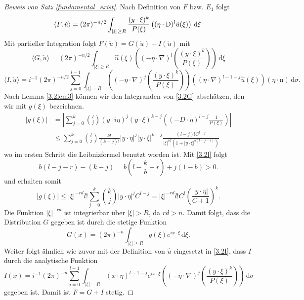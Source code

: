 \begin{proof}[Beweis von Satz \ref{fundamental_exist}]
Nach Definition von $F$ bzw. $E_1$ folgt 
\begin{equation}\label{3.2F}
\langle F, \check u\rangle = (2\pi)^{-n/2} \int_{|\xi|\ge R} \frac{(y\cdot \xi)^k}{P(\xi)} \left ( (\eta\cdot \mathrm D)^l \hat u(\xi)\right )\, \mathrm d\xi.
\end{equation}
Mit partieller Integration folgt $F(\check u)=G(\check u) + I(\check u)$ mit
\begin{equation}\label{3.2G}
\langle G,\check u\rangle = (2\pi)^{-n/2} \int_{|\xi|\ge R} \hat u(\xi) \left ( (-\eta \cdot \nabla)^l \left ( \frac{(y\cdot \xi)^k}{P(\xi)} \right ) \right )\, \mathrm d\xi
\end{equation}
\begin{equation}\label{3.2I}
\langle I,\check u\rangle = i^{-1} (2\pi)^{-n/2} \sum_{j=0}^{l-1} \int_{|\xi|=R} \left ( (-\eta \cdot \nabla)^j \left ( \frac{(y\cdot \xi)^k}{P(\xi)}\right ) \right ) \left ( (\eta \cdot \nabla)^{l-1-j} \hat u(\xi) \right ) (\eta \cdot \mathrm n) \, \mathrm d\sigma.
\end{equation}
Nach Lemma \ref{3.2lem3} können wir den Integranden von \eqref{3.2G} abschätzen, den wir mit $g(\xi)$ bezeichnen.
\begin{equation}
\begin{split}
|g(\xi)| &= \left | \sum_{j=0}^k \binom{l}{j} (y\cdot i\eta)^j (y \cdot \xi)^{k-j} \left ( (-D\cdot \eta)^{l-j} \frac{1}{P(\xi)} \right ) \right |\\
&\le \sum_{j=0}^k \binom{l}{j} \frac{k!}{(k-j)!} |y\cdot \eta|^j |y\cdot \xi|^{k-j}  \frac{(l-j)! C^{l-j}}{|\xi|^{rd} (1+|y\cdot \xi|^{b(l-j-r)})} 
\end{split}
\end{equation}
wo im ersten Schritt die Leibnizformel benutzt worden ist. Mit \eqref{3.2l} folgt
\begin{equation}
b(l-j-r) -(k-j)= b\left ( l-\frac{k}{b} -r \right )  + j(1-b) >0.
\end{equation}
und erhalten somit
\begin{equation}
|g(\xi)| \le |\xi|^{-rd} l! \sum_{j=0}^k \binom{k}{j} |y\cdot \eta|^j C^{l-j} = | \xi|^{-rd} l! C^l \left ( \frac{|y\cdot\eta|}{C+1} \right )^k.
\end{equation}
Die Funktion $|\xi|^{-rd}$ ist integrierbar über $|\xi|>R$, da $rd >n$.  Damit folgt, dass die Distribution $G$ gegeben ist durch die stetige Funktion
\begin{equation}
G(x) = (2\pi)^{-n} \int_{|\xi|\ge R} g(\xi) e^{i x\cdot \xi}\, \mathrm d\xi.
\end{equation}
Weiter folgt ähnlich wie zuvor mit der Definition von $\hat u$ eingesetzt in \eqref{3.2I}, dass $I$ durch die analytische Funktion 
\begin{equation}
I(x) = i^{-1}(2\pi)^{-n} \sum_{j=0}^{l-1} \int_{|\xi|=R} (x\cdot \eta)^{l-1-j} e^{ix\cdot \xi} \left ( (-\eta \cdot \nabla)^{j} \left ( \frac{(y\cdot \xi)^k}{P(\xi)} \right ) \right )\, \mathrm d\sigma
\end{equation} 
gegeben ist. Damit ist $F=G+I$ stetig.
\end{proof}

